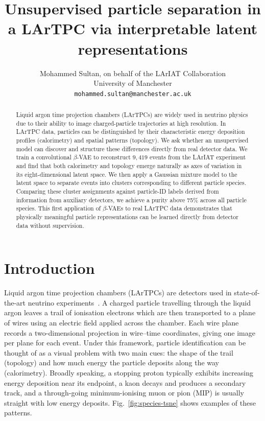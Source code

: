 \documentclass{article}
\title{Unsupervised particle separation in a LArTPC via interpretable latent representations}
\author{%
  Mohammed Sultan, on behalf of the LArIAT Collaboration \\
  University of Manchester \\
  \texttt{mohammed.sultan@manchester.ac.uk} \\  
}
\begin{document}
\maketitle

\begin{abstract}
Liquid argon time projection chambers (LArTPCs) are widely used in neutrino physics due to their ability to image charged-particle trajectories at high resolution. In LArTPC data, particles can be distinguished by their characteristic energy deposition profiles (calorimetry) and spatial patterns (topology). We ask whether an unsupervised model can discover and structure these differences directly from real detector data. We train a convolutional $\beta$-VAE to reconstruct $9{,}419$ events from the LArIAT experiment and find that both calorimetry and topology emerge naturally as axes of variation in its eight-dimensional latent space. We then apply a Gaussian mixture model to the latent space to separate events into clusters corresponding to different particle species. Comparing these cluster assignments against particle-ID labels derived from information from auxiliary detectors, we achieve a purity above 75\% across all particle species. This first application of $\beta$-VAEs to real LArTPC data demonstrates that physically meaningful particle representations can be learned directly from detector data without supervision. 


\end{abstract}

\section{Introduction}
\label{sec:introduction}

Liquid argon time projection chambers (LArTPCs) are detectors used in state-of-the-art neutrino experiments~\cite{Majumdar2021,Abi2020DUNE}. A charged particle travelling through the liquid argon leaves a trail of ionisation electrons which are then transported to a plane of wires using an electric field applied across the chamber. Each wire plane records a two-dimensional projection in wire--time coordinates, giving one image per plane for each event. Under this framework, particle identification can be thought of as a visual problem with two main cues: the shape of the trail (topology) and how much energy the particle deposits along the way (calorimetry). Broadly speaking, a stopping proton typically exhibits increasing energy deposition near its endpoint, a kaon decays and produces a secondary track, and a through-going minimum-ionising muon or pion (MIP) is usually straight with low energy deposits. Fig.~\ref{fig:species-tsne} shows examples of these patterns.
\end{document}
